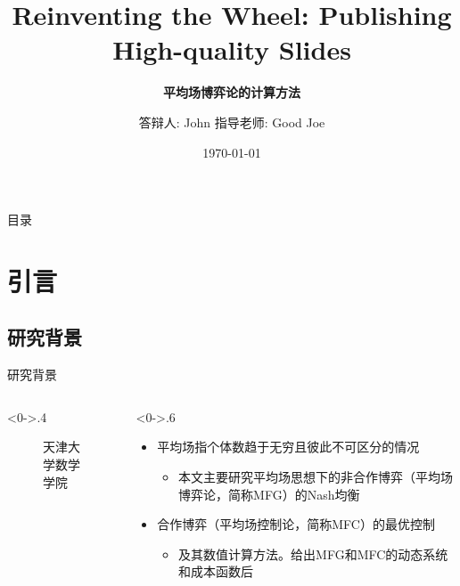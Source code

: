 \documentclass[10pt,aspectratio=43,table,fontset=none]{beamer}
\title{Reinventing the Wheel: Publishing High-quality Slides}
\subtitle{\fontsize{9pt}{14pt}\textbf{平均场博弈论的计算方法}}
\author{答辩人: John  \newline \quad 指导老师: Good Joe}
\institute{天津大学数学学院18级求是数学班}
\date{\today}
\begin{document}
\begin{frame}
	\titlepage
\end{frame}

\section[目录]{}   %
\begin{frame}{目录}
\tableofcontents
\end{frame}

\section{引言}  %
\subsection{研究背景}
\begin{frame}{研究背景}
	\begin{columns}[T] %
		\begin{column}<0->{.4\textwidth}
			\begin{figure}[htpb!]
				\centering
				\caption{天津大学数学学院}
				\label{fig:campus}
			\end{figure}
		\end{column}%
		\hfill%
		\begin{column}<0->{.6\textwidth}
			\begin{itemize}
				\item<1-> 平均场指个体数趋于无穷且彼此不可区分的情况
				\begin{itemize}
					\item<1-> 本文主要研究平均场思想下的非合作博弈（平均场博弈论，简称MFG）的Nash均衡
				\end{itemize}
				\item<1-> 合作博弈（平均场控制论，简称MFC）的最优控制
				\begin{itemize}
					\item<1-> 及其数值计算方法。给出MFG和MFC的动态系统和成本函数后
				\end{itemize}
			\end{itemize}
		\end{column}%
	\end{columns}
\end{frame}
\end{document}

